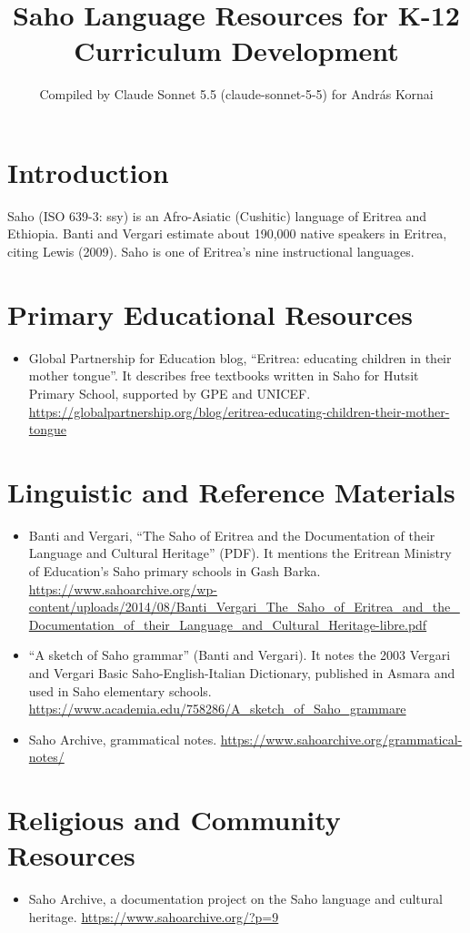 \documentclass[12pt]{article}
\title{Saho Language Resources for K-12 Curriculum Development}
\author{Compiled by Claude Sonnet 5.5 (claude-sonnet-5-5) for Andr\'as Kornai}
\date{}
\begin{document}
\maketitle

\section{Introduction}
Saho (ISO 639-3: ssy) is an Afro-Asiatic (Cushitic) language of Eritrea and Ethiopia. Banti and Vergari estimate about 190,000 native speakers in Eritrea, citing Lewis (2009). Saho is one of Eritrea's nine instructional languages.

\section{Primary Educational Resources}
\begin{itemize}
\item Global Partnership for Education blog, ``Eritrea: educating children in their mother tongue''. It describes free textbooks written in Saho for Hutsit Primary School, supported by GPE and UNICEF. \url{https://globalpartnership.org/blog/eritrea-educating-children-their-mother-tongue}
\end{itemize}

\section{Linguistic and Reference Materials}
\begin{itemize}
\item Banti and Vergari, ``The Saho of Eritrea and the Documentation of their Language and Cultural Heritage'' (PDF). It mentions the Eritrean Ministry of Education's Saho primary schools in Gash Barka. \url{https://www.sahoarchive.org/wp-content/uploads/2014/08/Banti_Vergari_The_Saho_of_Eritrea_and_the_Documentation_of_their_Language_and_Cultural_Heritage-libre.pdf}
\item ``A sketch of Saho grammar'' (Banti and Vergari). It notes the 2003 Vergari and Vergari Basic Saho-English-Italian Dictionary, published in Asmara and used in Saho elementary schools. \url{https://www.academia.edu/758286/A_sketch_of_Saho_grammare}
\item Saho Archive, grammatical notes. \url{https://www.sahoarchive.org/grammatical-notes/}
\end{itemize}

\section{Religious and Community Resources}
\begin{itemize}
\item Saho Archive, a documentation project on the Saho language and cultural heritage. \url{https://www.sahoarchive.org/?p=9}
\end{itemize}
\end{document}
